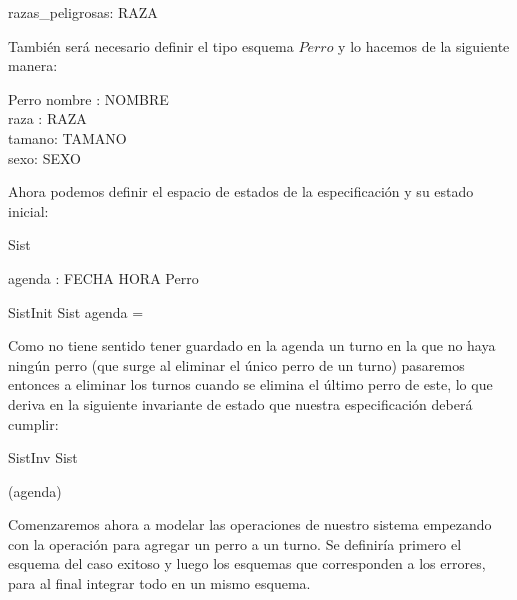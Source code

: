 \documentclass[12pt,zed]{article}
\begin{document}
\begin{axdef}
razas\_peligrosas: \power RAZA \\

\end{axdef}

También será necesario definir el tipo esquema $Perro$ y lo hacemos de la siguiente manera:

\begin{schema}{Perro}
    nombre : NOMBRE\\
    raza : RAZA \\
    
    tamano: TAMANO \\
    sexo: SEXO 
\end{schema}

Ahora podemos definir el espacio de estados de la especificación y su estado inicial:

\begin{schema}{Sist}


    agenda : FECHA \cross HORA \pfun \power Perro \\
    
\end{schema}

\begin{schema}{SistInit}
Sist
\where
agenda = \emptyset \\


\end{schema}

Como no tiene sentido tener guardado en la agenda un turno en la que no haya ningún perro (que surge al eliminar el único perro de un turno) pasaremos entonces a eliminar los turnos cuando se elimina el último perro de este, lo que deriva en la siguiente invariante de estado que nuestra especificación deberá cumplir:

\begin{schema}{SistInv}
Sist
\where

\emptyset \notin (\ran agenda) \\

\end{schema}


Comenzaremos ahora a modelar las operaciones de nuestro sistema empezando con la operación para agregar un perro a un turno. Se definiría primero el esquema del caso exitoso y luego los esquemas que corresponden a los errores, para al final integrar todo en un mismo esquema.
\end{document}
